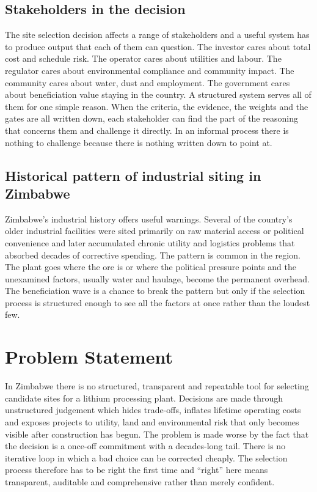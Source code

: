 \documentclass[12pt,a4paper]{report}
\begin{document}
\subsection{Stakeholders in the decision}
The site selection decision affects a range of stakeholders and a
useful system has to produce output that each of them can question.
The investor cares about total cost and schedule risk. The operator
cares about utilities and labour. The regulator cares about
environmental compliance and community impact. The community cares
about water, dust and employment. The government cares about
beneficiation value staying in the country. A structured system serves
all of them for one simple reason. When the criteria, the evidence,
the weights and the gates are all written down, each stakeholder can
find the part of the reasoning that concerns them and challenge it
directly. In an informal process there is nothing to challenge because
there is nothing written down to point at.

\subsection{Historical pattern of industrial siting in Zimbabwe}
Zimbabwe's industrial history offers useful warnings. Several of the
country's older industrial facilities were sited primarily on raw
material access or political convenience and later accumulated chronic
utility and logistics problems that absorbed decades of corrective
spending. The pattern is common in the region. The plant goes where
the ore is or where the political pressure points and the unexamined
factors, usually water and haulage, become the permanent overhead. The
beneficiation wave is a chance to break the pattern but only if the
selection process is structured enough to see all the factors at once
rather than the loudest few.

\section{Problem Statement}
In Zimbabwe there is no structured, transparent and repeatable tool for
selecting candidate sites for a lithium processing plant. Decisions are
made through unstructured judgement which hides trade-offs, inflates
lifetime operating costs and exposes projects to utility, land and
environmental risk that only becomes visible after construction has
begun. The problem is made worse by the fact that the decision is a
once-off commitment with a decades-long tail. There is no iterative
loop in which a bad choice can be corrected cheaply. The selection
process therefore has to be right the first time and ``right'' here
means transparent, auditable and comprehensive rather than merely
confident.
\end{document}
